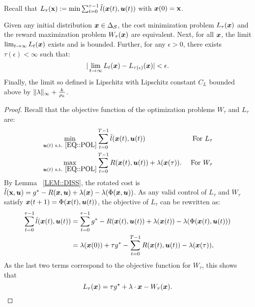 Recall that $L_{\tau}(\textbf{x}) := \min \sum_{t = 0}^{\tau - 1} \Tilde{l}({\bm{x}}(t), \bm{u}(t))$ with ${\bm{x}}(0) = \textbf{x}$.
\begin{lemma}
    \label{lem:C_vs_W}
    Given any initial distribution ${\bm{x}} \in\Delta_{\mathcal{S}}$, the cost minimization problem $L_{\tau}({\bm{x}})$ and the reward maximization problem $W_{\tau}{({\bm{x}})}$ are equivalent. Next, for all ${\bm{x}}$, the limit $\lim_{t \to \infty}L_{t}({\bm{x}})$ exists and is bounded. Further, for any $\epsilon > 0$, there exists $\tau(\epsilon) < \infty$ such that: 
    \[
    |\lim_{t \to \infty}L_{t}({\bm{x}}) - L_{\tau(\epsilon)}({\bm{x}})| < \epsilon.
    \]
    Finally, the limit so defined is Lipschitz with Lipschitz constant $C_{L}$ bounded above by $\|\lambda\|_{\infty} + \frac{k}{\rho_k}$.  
\end{lemma}
\begin{proof}
Recall that the objective function of the optimization problems $W_\tau$ and $L_\tau$ are:
\begin{align*}
    &\min_{\bm{u}(t) \text{ s.t. } \eqref{EQ::POL}}\sum_{t=0}^{T-1} \Tilde{l}({\bm{x}}(t), \bm{u}(t)) & \text{ For $L_\tau$}\\
    &\max_{\bm{u}(t) \text{ s.t. } \eqref{EQ::POL}}\sum_{t=0}^{T-1} R({\bm{x}}(t),\bm{u}(t)) + \lambda({\bm{x}}(\tau)). & \text{ For $W_\tau$}
\end{align*}
By Lemma ~\ref{LEM::DISS}, the rotated cost is $\Tilde{l}(\textbf{x}, \bm{u}) = g^* - R({\bm{x}},\bm{u})+\lambda({\bm{x}}) - \lambda(\Phi({\bm{x}},\bm{u}))$. As any valid control of $L_\tau$ and $W_\tau$ satisfy ${\bm{x}}(t+1)=\Phi({\bm{x}}(t),\bm{u}(t))$, the objective of $L_\tau$ can be rewritten as: 
\begin{align*}
    \sum_{t=0}^{\tau-1} \Tilde{l}({\bm{x}}(t), \bm{u}(t)) &= \sum_{t=0}^{\tau-1} g^* - R({\bm{x}}(t),\bm{u}(t)) + \lambda({\bm{x}}(t)) - \lambda(\Phi({\bm{x}}(t),\bm{u}(t)))\\
    &= \lambda({\bm{x}}(0)) + \tau g^* -  \sum_{t=0}^{T-1} R({\bm{x}}(t),\bm{u}(t)) - \lambda({\bm{x}}(\tau)),
\end{align*}
As the last two terms correspond to the objective function for $W_\tau$, this shows that 
\begin{equation}\label{EQ:COST_DEF}
    L_{\tau}({\bm{x}})= \tau g^{\star} + \lambda \cdot {\bm{x}} - W_{\tau}{({\bm{x}})}.
\end{equation} 


\end{proof}
